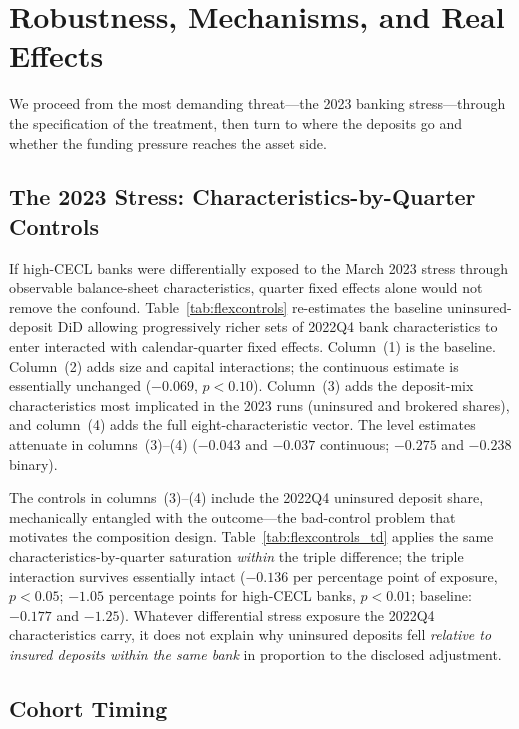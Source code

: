 \section{Robustness, Mechanisms, and Real Effects}
\label{sec:robustness}

We proceed from the most demanding threat---the 2023 banking
stress---through the specification of the treatment, then turn to where
the deposits go and whether the funding pressure reaches the asset side.

\subsection{The 2023 Stress: Characteristics-by-Quarter Controls}
\label{sec:robustness:stress}

If high-CECL banks were differentially exposed to the March 2023 stress
through observable balance-sheet characteristics, quarter fixed effects
alone would not remove the confound.  Table~\ref{tab:flexcontrols}
re-estimates the baseline uninsured-deposit DiD allowing progressively
richer sets of 2022Q4 bank characteristics to enter interacted with
calendar-quarter fixed effects.  Column~(1) is the baseline.  Column~(2)
adds size and capital interactions; the continuous estimate is essentially
unchanged ($-0.069$, $p<0.10$).  Column~(3) adds the deposit-mix
characteristics most implicated in the 2023 runs (uninsured and brokered
shares), and column~(4) adds the full eight-characteristic vector.  The
level estimates attenuate in columns~(3)--(4) ($-0.043$ and $-0.037$
continuous; $-0.275$ and $-0.238$ binary).

The controls in columns~(3)--(4) include the 2022Q4 uninsured deposit
share, mechanically entangled with the outcome---the bad-control problem
that motivates the composition design.
Table~\ref{tab:flexcontrols_td} applies the same
characteristics-by-quarter saturation \emph{within} the triple
difference; the triple interaction survives essentially intact
($-0.136$ per percentage point of exposure, $p<0.05$; $-1.05$ percentage
points for high-CECL banks, $p<0.01$; baseline: $-0.177$ and $-1.25$).
Whatever differential stress exposure the 2022Q4 characteristics carry,
it does not explain why uninsured deposits fell \emph{relative to
insured deposits within the same bank} in proportion to the disclosed
adjustment.

\subsection{Cohort Timing}
\label{sec:robustness:timing}

